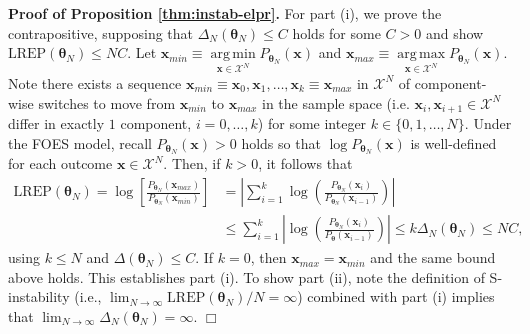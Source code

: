 \documentclass[numbib]{imamat}
\theoremstyle{theorem}
\theoremstyle{lemma}
\theoremstyle{example}
\theoremstyle{corollary}
\theoremstyle{definition}
\theoremstyle{remark}
\theoremstyle{approximation}
\theoremstyle{scheme}
\DeclareMathOperator*{\argmin}{arg\,min}
\DeclareMathOperator*{\argmax}{arg\,max}
\newcommand{\REP}{\mathrm{LREP}}
\newcommand{\DN}{\Delta_N}
\begin{document}
\textbf{Proof of Proposition \ref{thm:instab-elpr}.} For part (i), we
prove the contrapositive, supposing that
\(\DN(\boldsymbol \theta_N) \le C\) holds for some \(C > 0\) and show
\(\REP(\boldsymbol \theta_N) \leq NC\). Let
\(\boldsymbol x_{min} \equiv \argmin\limits_{\boldsymbol x \in \mathcal{X}^N}P_{\boldsymbol \theta_N}(\boldsymbol x)\)
and
\(\boldsymbol x_{max} \equiv \argmax\limits_{\boldsymbol x \in \mathcal{X}^N}P_{\boldsymbol \theta_N}(\boldsymbol x)\).
Note there exists a sequence
\(\boldsymbol x_{min} \equiv \boldsymbol x_0, \boldsymbol x_1, \dots, \boldsymbol x_k \equiv \boldsymbol x_{max}\)
in \(\mathcal{X}^N\) of component-wise switches to move from
\(\boldsymbol x_{min}\) to \(\boldsymbol x_{max}\) in the sample space
(i.e. \(\boldsymbol x_i, \boldsymbol x_{i + 1} \in \mathcal{X}^N\)
differ in exactly \(1\) component, \(i = 0, \dots, k\)) for some integer
\(k \in \{0, 1, \dots, N\}\). Under the FOES model, recall
\(P_{\boldsymbol \theta_N}(\boldsymbol x) > 0\) holds so that
\(\log P_{\boldsymbol \theta_N}(\boldsymbol x)\) is well-defined for
each outcome \(\boldsymbol x \in \mathcal{X}^N\). Then, if \(k > 0\), it
follows that \begin{align*}
\REP(\boldsymbol \theta_N) = \log\left[\frac{P_{\boldsymbol \theta_N}(\boldsymbol x_{max})}{P_{\boldsymbol \theta_N}(\boldsymbol x_{min})}\right] &= \left|\sum\limits_{i = 1}^k\log\left(\frac{P_{\boldsymbol \theta_N}(\boldsymbol x_i)}{P_{\boldsymbol \theta_N}(\boldsymbol x_{i-1})}\right)\right| \\
&\le \sum\limits_{i = 1}^k\left|\log\left(\frac{P_{\boldsymbol \theta_N}(\boldsymbol x_i)}{P_{\boldsymbol \theta}(\boldsymbol x_{i-1})}\right)\right| \le k \Delta_N(\boldsymbol \theta_N) \le NC,
\end{align*} using \(k \le N\) and
\(\Delta(\boldsymbol \theta_N) \le C\). If \(k = 0\), then
\(\boldsymbol x_{max} = \boldsymbol x_{min}\) and the same bound above
holds. This establishes part (i). To show part (ii), note the definition
of S-instability (i.e.,
\(\lim_{N\to \infty}\REP(\boldsymbol \theta_N)/N= \infty\)) combined
with part (i) implies that
\(\lim_{N\to \infty}\DN(\boldsymbol \theta_N)=\infty\). \hfill \(\Box\)
\end{document}
